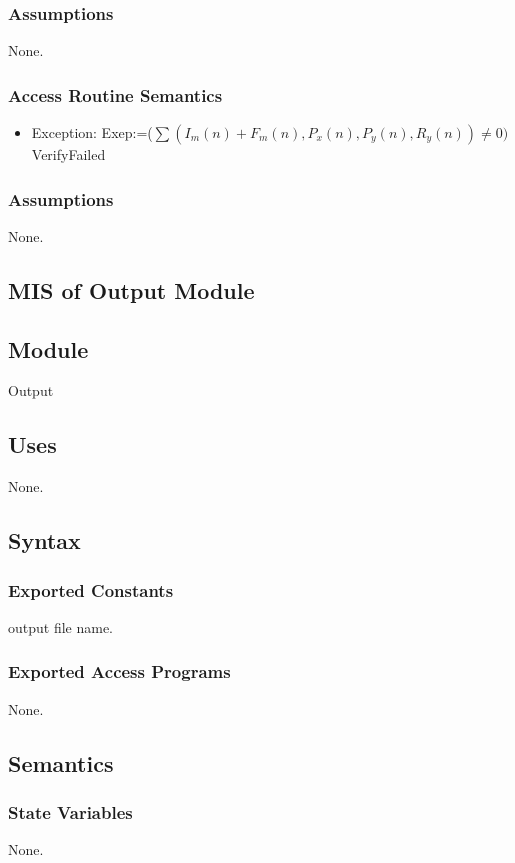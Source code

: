 \documentclass[12pt, titlepage]{article}
\begin{document}
\subsubsection{Assumptions}
None.
\subsubsection{Access Routine Semantics}
\begin{itemize}
    \item Exception: Exep:=($\sum { (I_m(n) + F_m(n), P_x(n),P_y(n),R_y(n))} \neq 0)$ \Rightarrow VerifyFailed
\end{itemize}
\subsubsection{Assumptions}
None.

\subsection{MIS of Output Module \label{mSpec} }

\subsection{Module}

Output

\subsection{Uses}
None.

\subsection{Syntax}

\subsubsection{Exported Constants}

output file name.
\subsubsection{Exported Access Programs}
None.
\subsection{Semantics}
\subsubsection{State Variables}
None.
\end{document}
